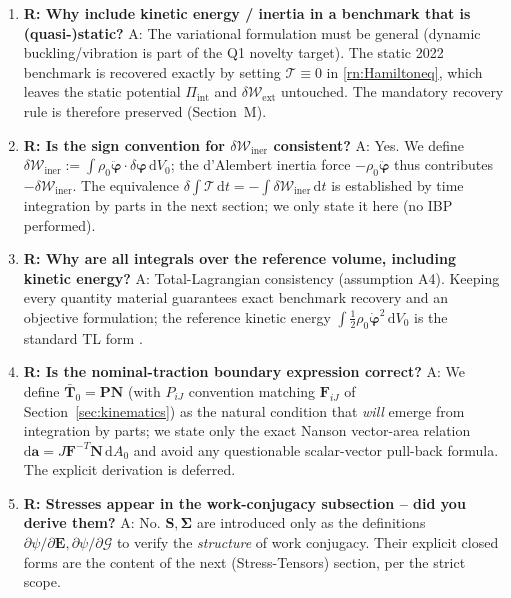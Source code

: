 \documentclass[11pt]{article}
\begin{document}
\begin{enumerate}
\item \textbf{R: Why include kinetic energy / inertia in a benchmark that is (quasi-)static?}
A: The variational formulation must be general (dynamic buckling/vibration is part of the Q1 novelty target). The static 2022 benchmark is recovered exactly by setting $\mathcal{T}\equiv 0$ in \eqref{rn:Hamiltoneq}, which leaves the static potential $\Pi_{\mathrm{int}}$ and $\delta\mathcal{W}_{\mathrm{ext}}$ untouched. The mandatory recovery rule is therefore preserved (Section~M).

\item \textbf{R: Is the sign convention for $\delta\mathcal{W}_{\mathrm{iner}}$ consistent?}
A: Yes. We define $\delta\mathcal{W}_{\mathrm{iner}}:=\int\rho_{0}\ddot{\boldsymbol{\varphi}}\cdot\delta\boldsymbol{\varphi}\,\mathrm{d}V_{0}$; the d'Alembert inertia force $-\rho_{0}\ddot{\boldsymbol{\varphi}}$ thus contributes $-\delta\mathcal{W}_{\mathrm{iner}}$. The equivalence $\delta\int\mathcal{T}\,\mathrm{d}t=-\int\delta\mathcal{W}_{\mathrm{iner}}\,\mathrm{d}t$ is established by time integration by parts in the next section; we only state it here (no IBP performed).

\item \textbf{R: Why are all integrals over the reference volume, including kinetic energy?}
A: Total-Lagrangian consistency (assumption A4). Keeping every quantity material guarantees exact benchmark recovery and an objective formulation; the reference kinetic energy $\int\tfrac12\rho_{0}\dot{\boldsymbol{\varphi}}^{2}\,\mathrm{d}V_{0}$ is the standard TL form \cite{BonetWood2008,Bathe2006,Holzapfel2000}.

\item \textbf{R: Is the nominal-traction boundary expression correct?}
A: We define $\bar{\mathbf{T}}_{0}=\mathbf{P}\mathbf{N}$ (with $P_{iJ}$ convention matching $\mathbf{F}_{iJ}$ of Section~\ref{sec:kinematics}) as the natural condition that \emph{will} emerge from integration by parts; we state only the exact Nanson vector-area relation $\mathrm{d}\mathbf{a}=J\mathbf{F}^{-T}\mathbf{N}\,\mathrm{d}A_{0}$ and avoid any questionable scalar-vector pull-back formula. The explicit derivation is deferred.

\item \textbf{R: Stresses appear in the work-conjugacy subsection -- did you derive them?}
A: No. $\mathbf{S},\boldsymbol{\Sigma}$ are introduced only as the definitions $\partial\psi/\partial\mathbf{E},\partial\psi/\partial\bm{\mathcal{G}}$ to verify the \emph{structure} of work conjugacy. Their explicit closed forms are the content of the next (Stress-Tensors) section, per the strict scope.


\end{enumerate}
\end{document}

